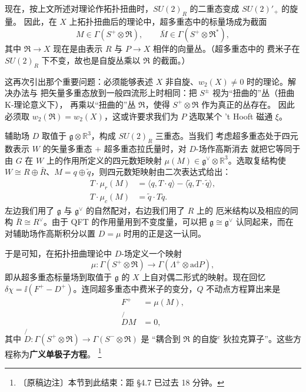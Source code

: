 现在，按上文所述对理论作拓扑扭曲时，$SU(2)_{R}$ 的二重态变成 $SU(2)'_{+}$ 的旋量。
因此，在 $X$ 上拓扑扭曲后的理论中，超多重态中的标量场成为截面
\begin{equation}
  M\in\Gamma(S^{+}\otimes\mathfrak{R}),\qquad
  \bar{M}\in\Gamma(S^{+}\otimes\mathfrak{R}^{*}),
  \tag{4.67}
\end{equation}
其中 $\mathfrak{R}\to X$ 现在是由表示 $R$ 与 $P\to X$ 相伴的向量丛。（超多重态中的
费米子在 $SU(2)_{R}$ 下不变，故也是自旋丛乘以 $\mathfrak{R}$ 的截面。）

这再次引出那个重要问题：必须能够表述 $X$ 非自旋、$w_{2}(X)\neq0$ 时的理论。解决办法与
把矢量多重态放到一般四流形上时相同：把 $S^{\pm}$ 视为“扭曲的”丛（扭曲 K-理论意义下），
再乘以“扭曲的”丛 $\mathfrak{R}$，使得 $S^{+}\otimes\mathfrak{R}$ 作为真正的丛存在。
因此必须取 $w_{2}(\mathfrak{R})=w_{2}(X)$，这或许要求我们为 $P$ 选取某个 't Hooft
磁通 $\xi$。

辅助场 $D$ 取值于 $\mathfrak{g}\otimes\mathbb{R}^{3}$，构成 $SU(2)_{R}$ 三重态。当我们
考虑超多重态处于四元数表示 $W$ 的矢量多重态 $+$ 超多重态拉氏量时，对 $D$-场作高斯消去
就把它等同于由 $G$ 在 $W$ 上的作用所定义的四元数矩映射
$\mu(M)\in\mathfrak{g}^{\vee}\otimes\mathbb{R}^{3}$。选取复结构使
$W\cong R\oplus\bar R$、$M=q\oplus\tilde q$，则四元数矩映射由二次表达式给出：
\begin{equation}
  \begin{aligned}
    T\cdot\mu_{r}(M)&=\langle q,T\cdot q\rangle
      -\langle\tilde q,T\cdot\tilde q\rangle,\\
    T\cdot\mu_{c}(M)&=\tilde q\cdot Tq .
  \end{aligned}
  \tag{4.68}
\end{equation}
左边我们用了 $\mathfrak{g}$ 与 $\mathfrak{g}^{\vee}$ 的自然配对，右边我们用了 $R$ 上的
厄米结构以及相应的同构 $\bar R\cong R^{\vee}$。由于 QFT 的作用量用到不变度量，可以把
$\mathfrak{g}\cong\mathfrak{g}^{\vee}$ 认同起来，而在对辅助场作高斯积分以置
$D=\mu$ 时用的正是这一认同。

于是可知，在拓扑扭曲理论中 $D$-场定义一个映射
\begin{equation}
  \mu:\Gamma(S^{+}\otimes\mathfrak{R})\to\Gamma(\Lambda^{+}\otimes\mathrm{ad}P),
  \tag{4.69}
\end{equation}
即从超多重态标量场到取值于 $\mathfrak{g}$ 的 $X$ 上自对偶二形式的映射。现在回忆
$\delta\chi=\ii(F^{+}-D^{+})$。连同超多重态中费米子的变分，$Q$ 不动点方程算出来是
\begin{equation}
  \begin{aligned}
    F^{+}&=\mu(M),\\
    \not{D}M&=0,
  \end{aligned}
  \tag{4.70}
\end{equation}
其中 $\not{D}:\Gamma(S^{+}\otimes\mathfrak{R})\to\Gamma(S^{-}\otimes\mathfrak{R})$ 是
“耦合到 $\mathfrak{R}$ 的自旋$^c$ 狄拉克算子”。这些方程称为\textbf{广义单极子方程}。
\footnote{〔原稿边注〕本节到此结束：距 §4.7 已过去 18 分钟。}

